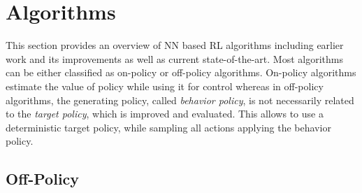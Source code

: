     \section{Algorithms}
	    \label{sec:algo}
	    This section provides an overview of NN based RL algorithms including earlier work and its improvements as well as current state-of-the-art. 
	    Most algorithms can be either classified as on-policy or off-policy algorithms.
		On-policy algorithms estimate the value of policy while using it for control whereas in off-policy algorithms, the generating policy, called \textit{behavior policy}, is not necessarily related to the \textit{target policy}, which is improved and evaluated.
		This allows to use a deterministic target policy, while sampling all actions applying the behavior policy. \cite[chapter 5]{Sutton2018}
		
 	\subsection{Off-Policy}
